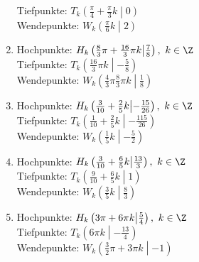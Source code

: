 \begin{Answer}[ref=sincosExtremWendeA1]
\begin{enumerate}[label=\alph*)]
		Tiefpunkte: \(T_k\left(\frac{\pi}{4}+\frac{\pi}{3}k \middle\vert0 \right)\)\\
		Wendepunkte: \(W_k\left(\frac{\pi}{6}k \middle\vert2 \right)\)
		\item Hochpunkte: \(H_k\left(\frac{8}{3}\pi+\frac{16}{3}\pi k \middle\vert\frac{7}{8} \right),\ k\in\Z\)\\
		Tiefpunkte: \(T_k\left(\frac{16}{3}\pi k \middle\vert-\frac{5}{8} \right)\)\\
		Wendepunkte: \(W_k\left(\frac{4}{3}\pi\frac{8}{3}\pi k \middle\vert\frac{1}{8} \right)\)
		\item Hochpunkte: \(H_k\left(\frac{3}{10}+\frac{2}{5}k \middle\vert-\frac{15}{26} \right),\ k\in\Z\)\\
		Tiefpunkte: \(T_k\left(\frac{1}{10}+\frac{2}{5}k \middle\vert-\frac{115}{26} \right)\)\\
		Wendepunkte: \(W_k\left(\frac{1}{5}k \middle\vert-\frac{5}{2} \right)\)
		\item Hochpunkte: \(H_k\left(\frac{3}{10}+\frac{6}{5}k \middle\vert\frac{13}{3} \right),\ k\in\Z\)\\
		Tiefpunkte: \(T_k\left(\frac{9}{10}+\frac{6}{5}k \middle\vert1 \right)\)\\
		Wendepunkte: \(W_k\left(\frac{3}{5}k \middle\vert\frac{8}{3} \right)\)
		\item Hochpunkte: \(H_k\left(3\pi+6\pi k \middle\vert\frac{5}{4} \right),\ k\in\Z\)\\
		Tiefpunkte: \(T_k\left(6\pi k \middle\vert-\frac{13}{4} \right)\)\\
		Wendepunkte: \(W_k\left(\frac{3}{2}\pi+3\pi k \middle\vert-1 \right)\)
	\end{enumerate}
\end{Answer}